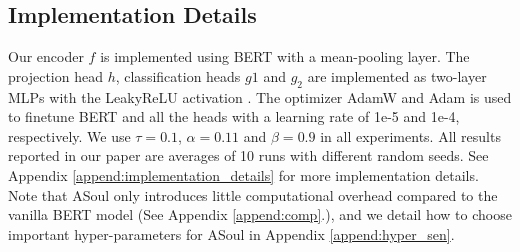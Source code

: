 \documentclass[11pt]{article}
\begin{document}
\subsection{Implementation Details}
Our encoder $f$ is implemented using BERT \cite{devlin2018bert} with a mean-pooling layer. The projection head $h$, classification heads $g1$ and $g_2$ are implemented as two-layer MLPs with the LeakyReLU activation \cite{xu2020reluplex}. The optimizer AdamW and Adam \cite{kingma2014adam} is used to finetune BERT and all the heads with a learning rate of 1e-5 and 1e-4, respectively. We use $\tau=0.1$, $\alpha=0.11$ and $\beta=0.9$ in all experiments. All results reported in our paper are averages of 10 runs with different random seeds. See Appendix \ref{append:implementation_details} for more implementation details.
Note that ASoul only introduces little computational overhead compared to the vanilla BERT model (See Appendix \ref{append:comp}.),
and we detail how to choose important hyper-parameters for ASoul in Appendix \ref{append:hyper_sen}.
\end{document}
